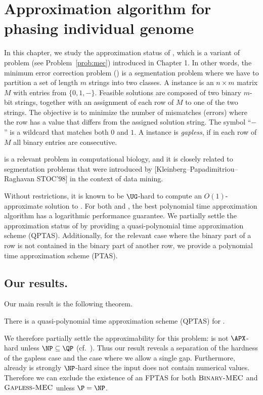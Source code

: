 \chapter{Approximation algorithm for phasing individual genome}

In this chapter, we study the approximation status of \GMEC, which is a variant of \MEC problem (see Problem~\ref{prob:mec}) introduced in Chapter 1.
In other words, the minimum error correction problem (\MEC) is a segmentation problem where we have to partition a set of length $m$ strings into two classes.
A \MEC instance is an $n \times m$ matrix $M$ with entries from $\{0,1,-\}$. 
    Feasible solutions are composed of two binary $m$-bit strings, together with an assignment of each row of $M$ to one of the two strings.
    The objective is to minimize the number of mismatches (errors) where the row has a value that differs from the assigned solution string.
    The symbol ``$-$'' is a wildcard that matches both $0$ and $1$.
    A \MEC instance is \textit{gapless}, if in each row of $M$ all binary entries are consecutive.

 \GMEC is a relevant problem in computational biology, and it is closely related to segmentation problems that were introduced by {[}Kleinberg--Papadimitriou--Raghavan STOC'98{]} in the context of data mining.
 
     Without restrictions, it is known to be $\UG$-hard \citep{trevisan2012khot} to compute an $O(1)$-approximate solution to \MEC. For both \MEC and \GMEC, the best polynomial time approximation algorithm has a logarithmic performance guarantee.
    We partially settle the approximation status of \GMEC by providing a quasi-polynomial time approximation scheme (QPTAS).
    Additionally, for the relevant case where the binary part of a row is not contained in the binary part of another row, we provide a polynomial time approximation scheme (PTAS).

\section{Our results.}
Our main result is the following theorem.
\begin{theorem}\label{thm:qptas}
    There is a quasi-polynomial time approximation scheme (QPTAS) for \GMEC.
\end{theorem}
We therefore partially settle the approximability for this problem: \GMEC is not $\APX$-hard unless $\NP \subseteq \QP$ (cf.~\cite{RS09_approximation}).
Thus our result reveals a separation of the hardness of the gapless case and the case where we allow a single gap.
Furthermore, already \BMEC is strongly $\NP$-hard since the input does not contain numerical values. 
Therefore we can exclude the existence of an FPTAS for both $\textsc{Binary-MEC}$ and $\textsc{Gapless-MEC}$ unless $\P = \NP$.

